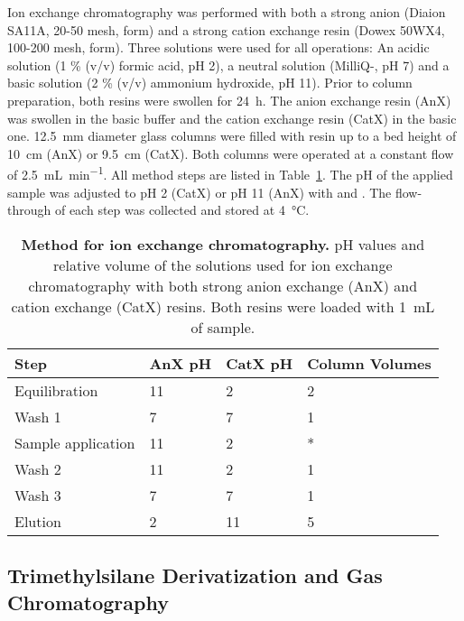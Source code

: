 Ion exchange chromatography was performed with both a strong anion (Diaion SA11A, 20-50 mesh,  form) and a strong cation exchange resin (Dowex 50WX4, 100-200 mesh,  form).
Three solutions were used for all operations: An acidic solution (1 \% (v/v) formic acid, pH 2), a neutral solution (MilliQ-, pH 7) and a basic solution (2 \% (v/v) ammonium hydroxide, pH 11).
Prior to column preparation, both resins were swollen for \SI{24}{\hour}.
The anion exchange resin (AnX) was swollen in the basic buffer and the cation exchange resin (CatX) in the basic one.
\SI{12.5}{\milli\meter} diameter glass columns were filled with resin up to a bed height of \SI{10}{\centi\meter} (AnX) or \SI{9.5}{\centi\meter} (CatX).
Both columns were operated at a constant flow of \SI{2.5}{\milli\liter\per\minute}.
All method steps are listed in Table~\ref{tab:method_ion_exchange}.
The pH of the applied sample was adjusted to pH 2 (CatX) or pH 11 (AnX) with  and .
The flow-through of each step was collected and stored at \SI{4}{\celsius}.

\begin{table}[htbp]
	\caption[Method for ion exchange chromatography]{%
			\textbf{Method for ion exchange chromatography.}
			pH values and relative volume of the solutions used for ion exchange chromatography with both strong anion exchange (AnX) and cation exchange (CatX) resins.
			Both resins were loaded with \SI{1}{\milli\liter} of sample.}
	\label{tab:method_ion_exchange}
	\centering
	\begin{tabularx}{\textwidth}{XXXX}
		\toprule
		\textbf{Step} 			& \textbf{AnX pH}	& \textbf{CatX pH} 	& \textbf{Column Volumes} 	\\
		\midrule
		Equilibration 	 		& 11 				& 2 				& 2		\\
		Wash 1 					& 7 				& 7 				& 1 	\\
		Sample application 		& 11 				& 2 				& *		\\
		Wash 2  				& 11 				& 2 				& 1 	\\
		Wash 3 					& 7					& 7 				& 1 	\\
		Elution 				& 2 				& 11 				& 5 	\\
		\bottomrule
	\end{tabularx}
\end{table}

\subsection{Trimethylsilane Derivatization and Gas Chromatography} %
\label{sub:trimethylsilane_derivatization_and_gas_chromatography}

